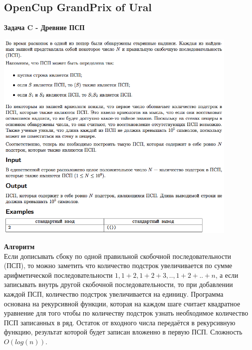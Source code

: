 \documentclass[a4paper,12pt]{article}
\begin{document}
%
%
\newpage
\subsection{OpenCup GrandPrix of Ural}

\textbf{{\large Задача C - Древние ПСП}} \\
\begin{center}
\includegraphics[width=0.9\textwidth]{OC_Ural/OC_Ural_C.png}\\ [1cm]
\end{center}
\newpage

\textbf{{\large Алгоритм}} \\
Если дописывать сбоку по одной правильной скобочной последовательности (ПСП), то можно заметить что количество подстрок увеличивается по сумме арифметической последовательности $1, 1+2, 1+2+3, .., 1+2+..+n$, а если записывать внутрь другой скобочной последовательности, то при добавлении каждой ПСП, количество подстрок увеличивается на единицу. Программа основана на рекурсивной функции, которая на каждом шаге считает квадратное уравнение для того чтобы по количеству подстрок узнать необходимое количество ПСП записанных в ряд. Остаток от входного числа передаётся в рекурсивную функцию, результат которой будет записан вложенно в первую ПСП. Сложность $O(log(n))$.\\ 
\end{document}

